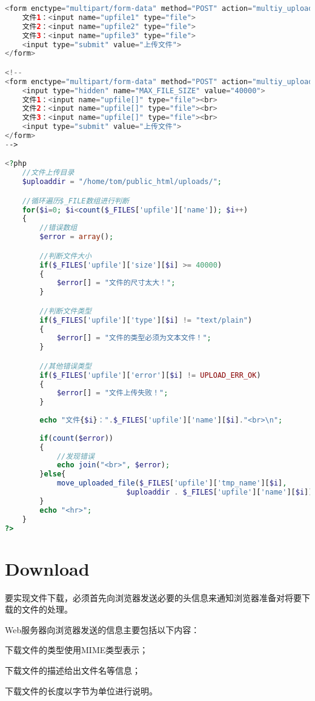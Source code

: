 \begin{lstlisting}[language=PHP]
<form enctype="multipart/form-data" method="POST" action="multiy_upload.php">
	文件1：<input name="upfile1" type="file">
	文件2：<input name="upfile2" type="file">
	文件3：<input name="upfile3" type="file">
	<input type="submit" value="上传文件">
</form>

<!--
<form enctype="multipart/form-data" method="POST" action="multiy_upload.php">
	<input type="hidden" name="MAX_FILE_SIZE" value="40000">
	文件1：<input name="upfile[]" type="file"><br>
	文件2：<input name="upfile[]" type="file"><br>
	文件3：<input name="upfile[]" type="file"><br>
	<input type="submit" value="上传文件">
</form>
-->

<?php
	//文件上传目录
	$uploaddir = "/home/tom/public_html/uploads/";

	//循环遍历$_FILE数组进行判断
	for($i=0; $i<count($_FILES['upfile']['name']); $i++)
	{
		//错误数组
		$error = array();

		//判断文件大小
		if($_FILES['upfile']['size'][$i] >= 40000)
		{
			$error[] = "文件的尺寸太大！";
		}

		//判断文件类型
		if($_FILES['upfile']['type'][$i] != "text/plain")
		{
			$error[] = "文件的类型必须为文本文件！";
		}

		//其他错误类型
		if($_FILES['upfile']['error'][$i] != UPLOAD_ERR_OK)
		{
			$error[] = "文件上传失败！";
		}
	
		echo "文件{$i}：".$_FILES['upfile']['name'][$i]."<br>\n";
	
		if(count($error))
		{
			//发现错误
			echo join("<br>", $error);
		}else{
			move_uploaded_file($_FILES['upfile']['tmp_name'][$i],
							$uploaddir . $_FILES['upfile']['name'][$i]);
		}
		echo "<hr>";
	}
?>
\end{lstlisting}



\section{Download}


要实现文件下载，必须首先向浏览器发送必要的头信息来通知浏览器准备对将要下载的文件的处理。

Web服务器向浏览器发送的信息主要包括以下内容：

\begin{compactitem}
\item 下载文件的类型使用MIME类型表示；
\item 下载文件的描述给出文件名等信息；
\item 下载文件的长度以字节为单位进行说明。
\end{compactitem}

